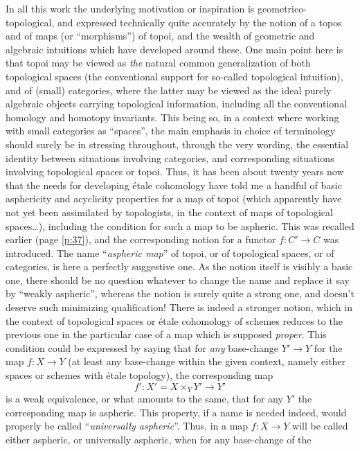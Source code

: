 In all this work the underlying motivation or inspiration is
geometrico-topological, and expressed technically quite accurately by
the notion of a topos and of maps (or ``morphisms'') of topoi, and the
wealth of geometric and algebraic intuitions which have developed
around these. One main point here is that topoi may be viewed as
\emph{the} natural common generalization of both topological spaces
(the conventional support for so-called topological intuition), and of
(small) categories, where the latter may be viewed as the ideal purely
algebraic objects carrying topological information, including all the
conventional homology and homotopy invariants. This being so, in a
context where working with small categories as ``spaces'', the main
emphasis in choice of terminology should surely be in stressing
throughout, through the very wording, the essential identity between
situations involving categories, and corresponding situations
involving topological spaces or topoi. Thus, it has been about twenty
years now that the needs for developing \'etale cohomology have told
me a handful of basic asphericity and acyclicity properties for a map
of topoi (which apparently have not yet been assimilated by
topologists, in the context of maps of topological spaces\ldots),
including the condition for such a map to be aspheric. This was
recalled earlier (page \ref{p:37}), and the corresponding notion for a
functor $f:C'\to C$ was introduced. The name ``\emph{aspheric map}''
of topoi, or of topological spaces, or of categories, is here a
perfectly suggestive one. As the notion itself is visibly a basic one,
there should be no question whatever to change the name and replace it
say by ``weakly aspheric'', whereas the notion is surely quite a
strong one, and doesn't deserve such minimizing qualification! There
is indeed a stronger notion, which in the context of topological
spaces or \'etale cohomology of schemes reduces to the previous one in
the particular case of a map which is supposed \emph{proper}. This
condition could be expressed by saying that for \emph{any} base-change
$Y'\to Y$ for the map $f:X\to Y$ (at least any base-change
within the given context, namely either spaces or schemes with \'etale
topology), the corresponding map
\[ f': X'=X\times_YY'\to Y'\]
is a weak equivalence, or what amounts to the same, that for any $Y'$
the corresponding map is aspheric. This property, if a name is needed
indeed, would properly be called ``\emph{universally
  aspheric}''. Thus, in \Cat{} a map $f:X\to Y$ will be called either
aspheric, or universally aspheric, when for any base-change of the
